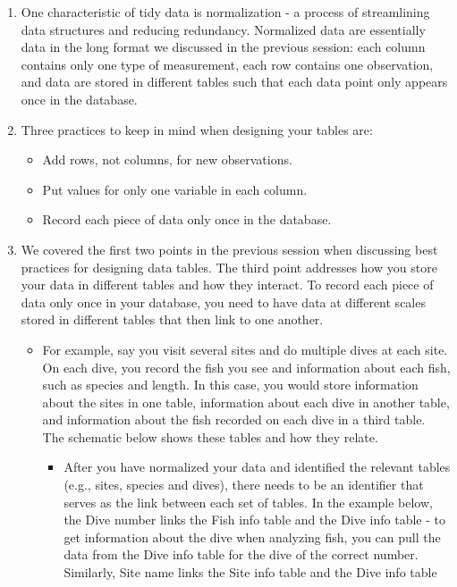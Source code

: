 \documentclass[
]{book}
\providecommand{\tightlist}{%
  \setlength{\itemsep}{0pt}\setlength{\parskip}{0pt}}
\begin{document}
\begin{enumerate}
\def\labelenumi{\arabic{enumi}.}
\item
  One characteristic of tidy data is normalization - a process of streamlining data structures and reducing redundancy. Normalized data are essentially data in the long format we discussed in the previous session: each column contains only one type of measurement, each row contains one observation, and data are stored in different tables such that each data point only appears once in the database.
\item
  Three practices to keep in mind when designing your tables are:

  \begin{itemize}
  \item
    Add rows, not columns, for new observations.
  \item
    Put values for only one variable in each column.
  \item
    Record each piece of data only once in the database.
  \end{itemize}
\item
  We covered the first two points in the previous session when discussing best practices for designing data tables. The third point addresses how you store your data in different tables and how they interact. To record each piece of data only once in your database, you need to have data at different scales stored in different tables that then link to one another.

  \begin{itemize}
  \item
    For example, say you visit several sites and do multiple dives at each site. On each dive, you record the fish you see and information about each fish, such as species and length. In this case, you would store information about the sites in one table, information about each dive in another table, and information about the fish recorded on each dive in a third table. The schematic below shows these tables and how they relate.

    \begin{itemize}
    \tightlist
    \item
      After you have normalized your data and identified the relevant tables (e.g., sites, species and dives), there needs to be an identifier that serves as the link between each set of tables. In the example below, the Dive number links the Fish info table and the Dive info table - to get information about the dive when analyzing fish, you can pull the data from the Dive info table for the dive of the correct number. Similarly, Site name links the Site info table and the Dive info table
      \href{images/M2S3_normalization_data_tables.png}{}
    \end{itemize}
  \end{itemize}
\end{enumerate}
\end{document}
